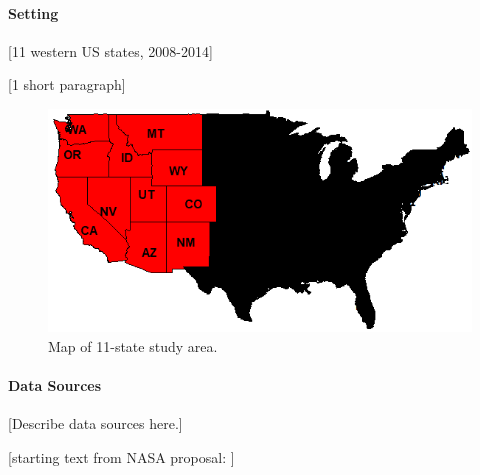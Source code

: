 \documentclass[authoryear]{elsarticle}
\begin{document}

\paragraph{Setting} [11 western US states, 2008-2014]

[1 short paragraph]

\begin{figure}%
\includegraphics[width=1\textwidth]{WesternStatesNoTitleCropped.png} %
\caption{\label{fig:Map11States}Map of 11-state study area.} %
\end{figure} %

\paragraph{Data Sources} [Describe data sources here.]

[starting text from NASA proposal: ]
\end{document}
